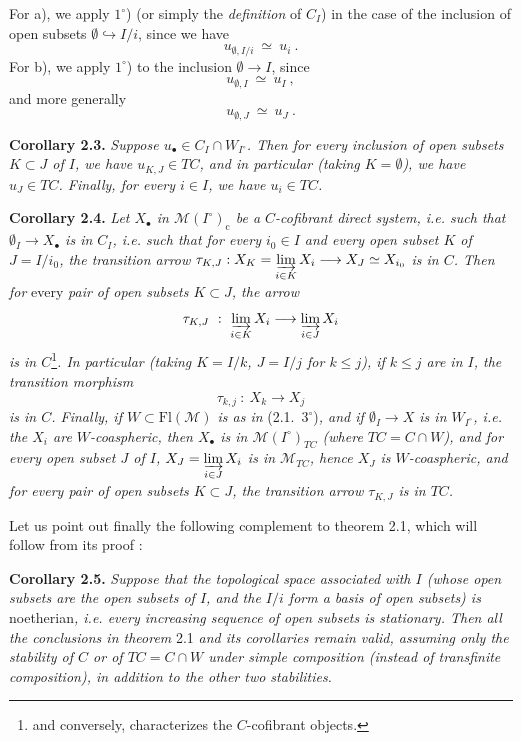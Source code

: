 \documentclass[11pt]{article}
\newcommand{\printedpage}[1]{\marginpar{\footnotesize p.~#1}}
\newcommand{\msp}[1]{\marginpar{\footnotesize [#1]}}
\newcommand{\Fl}{\mathrm{Fl}}
\newcommand{\M}{\mathcal{M}}
\begin{document}
\printedpage{16}

\msp{page 28}

For a), we apply $1^\circ$) (or simply the \textit{definition} of $C_I$) in the case of the inclusion of open subsets $\emptyset \hookrightarrow I/i$, since we have
\[
u_{\emptyset,I/i} \ \simeq\ u_i \ .
\]
For b), we apply $1^\circ$) to the inclusion $\emptyset \longrightarrow I$, since
\[
u_{\emptyset,I} \ \simeq\ u_I \ ,
\]
and more generally
\[
u_{\emptyset,J} \ \simeq\ u_J \ .
\]

\textbf{Corollary 2.3.} \textit{Suppose $u_\bullet \in C_I \cap W_{I^\circ}$. Then for every inclusion of open subsets $K \subset J$ of $I$, we have $u_{K,J} \in TC$, and in particular (taking $K = \emptyset$), we have $u_J \in TC$. Finally, for every $i \in I$, we have $u_i \in TC$.}

\textbf{Corollary 2.4.} \textit{Let $X_\bullet$ in $\M(I^\circ)_{\mathrm{c}}$ be a $C$-cofibrant direct system, i.e. such that $\emptyset_I \longrightarrow X_\bullet$ is in $C_I$, i.e. such that for every $i_0 \in I$ and every open subset $K$ of $J = I/i_0$, the transition arrow $\tau_{K,J} : X_K = \varinjlim\limits_{i\in K} X_i \longrightarrow X_J \simeq X_{i_0}$ is in $C$. Then for} \textup{every} \textit{pair of open subsets $K \subset J$, the arrow}
\[
\tau_{K,J} \ :\ \varinjlim_{i\in K} X_i \longrightarrow \varinjlim_{i\in J} X_i
\]
\textit{is in $C$}\footnote[12]{and conversely, characterizes the $C$-cofibrant objects.}\textit{. In particular (taking $K = I/k$, $J = I/j$ for $k \leq j$), if $k \leq j$ are in $I$, the transition morphism}
\[
\tau_{k,j} \ :\ X_k \longrightarrow X_j
\]
\msp{page 29}
\textit{is in $C$. Finally, if $W \subset \Fl(\M)$ is as in} \textup{(2.1.\ $3^\circ$)}\textit{, and if $\emptyset_I \longrightarrow X$ is in $W_{I^\circ}$, i.e. the $X_i$ are $W$-coaspheric, then $X_\bullet$ is in $\M(I^\circ)_{TC}$ (where $TC = C \cap W$), and for every open subset $J$ of $I$, $X_J = \varinjlim\limits_{i\in J} X_i$ is in $\M_{TC}$, hence $X_J$ is $W$-coaspheric, and for every pair of open subsets $K \subset J$, the transition arrow $\tau_{K,J}$ is in $TC$.}

Let us point out finally the following complement to theorem 2.1, which will follow from its proof :

\textbf{Corollary 2.5.} \textit{Suppose that the topological space associated with $I$ (whose open subsets are the open subsets of $I$, and the $I/i$ form a basis of open subsets) is} \textup{noetherian}\textit{, i.e. every increasing sequence of open subsets is stationary. Then all the conclusions in theorem} \textup{2.1} \textit{and its corollaries remain valid, assuming only the stability of $C$ or of $TC = C \cap W$ under simple composition (instead of transfinite composition), in addition to the other two stabilities.}
\end{document}
